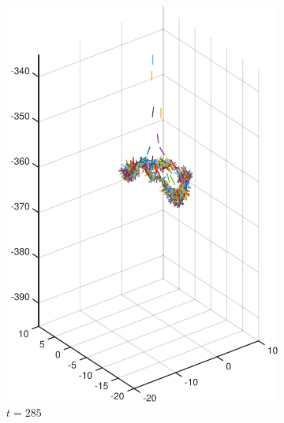 \documentclass[a4paper,11pt]{kth-mag}
\begin{document}
\begin{figure}
\begin{subfigure}[h]{0.4\textwidth}
    \includegraphics[width=\textwidth]{img/sphere_00150.pdf}
    \caption{$t=285$}\label{fig:sphere_simulation_1c}
  \end{subfigure}
  \begin{subfigure}[h]{0.4\textwidth}
    \centering

\end{subfigure}
\end{figure}
\end{document}
